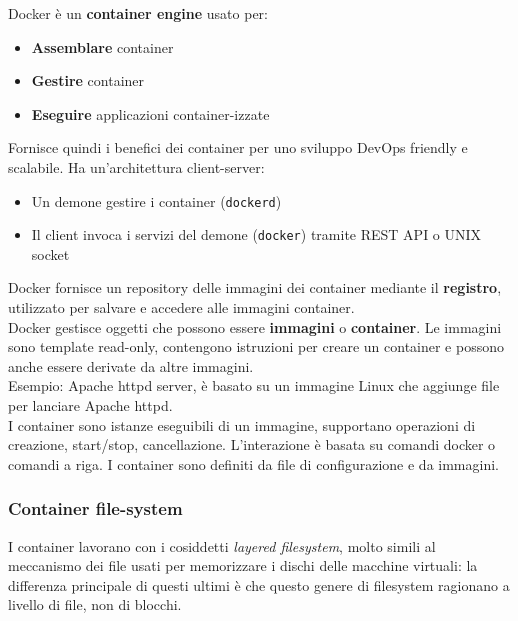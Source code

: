 \documentclass{article}
\begin{document}
		Docker è un \textbf{container engine} usato per:
		\begin{itemize}
			\item \textbf{Assemblare} container
			\item \textbf{Gestire} container
			\item \textbf{Eseguire} applicazioni container-izzate
		\end{itemize}
		Fornisce quindi i benefici dei container per uno sviluppo DevOps friendly e scalabile.
		Ha un'architettura client-server:
		\begin{itemize}
			\item Un demone gestire i container (\verb*|dockerd|)
			\item Il client invoca i servizi del demone (\verb*|docker|) tramite REST API o UNIX socket
		\end{itemize}
		Docker fornisce un repository delle immagini dei container mediante il \textbf{registro}, utilizzato per salvare e accedere alle immagini container.\\
		
		Docker gestisce oggetti che possono essere \textbf{immagini} o \textbf{container}.
		Le immagini sono template read-only, contengono istruzioni per creare un container e possono anche essere derivate da altre immagini.\\
		Esempio: Apache httpd server, è basato su un immagine Linux che aggiunge file per lanciare Apache httpd.\\
		
		I container sono istanze eseguibili di un immagine, supportano operazioni di creazione, start/stop, cancellazione.
		L'interazione è basata su comandi docker o comandi a riga. I container sono definiti da file di configurazione e da immagini.
		
		\subsubsection{Container file-system}
		I container lavorano con i cosiddetti \emph{layered filesystem}, molto simili al meccanismo dei file usati per memorizzare i dischi delle macchine virtuali: la differenza principale di questi ultimi è che questo genere di filesystem ragionano a livello
		di file, non di blocchi.\\
		
\end{document}
